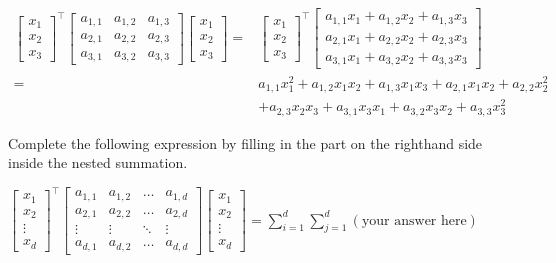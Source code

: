 \documentclass[assignment02_Solutions]{subfiles}
\begin{document}
\begin{exercise}[(15 minutes)]
\begin{boxedsolution}
\begin{align}
\begin{bmatrix} x_1 \\ x_2 \\ x_3 \end{bmatrix}^\top \begin{bmatrix} a_{1,1} & a_{1,2} & a_{1,3} \\ a_{2,1} & a_{2,2} & a_{2,3} \\ a_{3,1} & a_{3,2} & a_{3,3} \end{bmatrix}\begin{bmatrix} x_1 \\ x_2 \\ x_3 \end{bmatrix} =&  \begin{bmatrix} x_1 \\ x_2 \\ x_3 \end{bmatrix}^\top \begin{bmatrix} a_{1,1} x_1 + a_{1,2} x_2 + a_{1,3} x_3 \\ a_{2,1} x_1 + a_{2,2} x_2 + a_{2,3} x_3 \\ a_{3,1} x_1 + a_{3,2} x_2 + a_{3,3} x_3 \end{bmatrix} \\
=& a_{1,1} x_1^2 + a_{1,2}x_1x_2 + a_{1,3} x_1 x_3 + a_{2,1}x_1 x_2 + a_{2,2} x_2^2  \nonumber \\
&+ a_{2,3} x_2 x_3 + a_{3,1} x_3 x_1 + a_{3,2} x_3 x_2 + a_{3,3} x_3^2
\end{align}
\end{boxedsolution}

\item Complete the following expression by filling in the part on the righthand side inside the nested summation.

$\begin{bmatrix} x_1 \\ x_2 \\ \vdots \\ x_d \end{bmatrix}^\top \begin{bmatrix} a_{1,1} & a_{1,2} & \ldots & a_{1,d} \\ a_{2,1} & a_{2,2} & \ldots & a_{2,d} \\ \vdots & \vdots & \ddots & \vdots \\ a_{d,1} & a_{d,2} & \ldots & a_{d,d} \end{bmatrix}\begin{bmatrix} x_1 \\ x_2 \\ \vdots \\ x_d \end{bmatrix} = \sum_{i=1}^d \sum_{j=1}^d \left (\mbox{your answer here} \right )$


\end{exercise}
\end{document}
